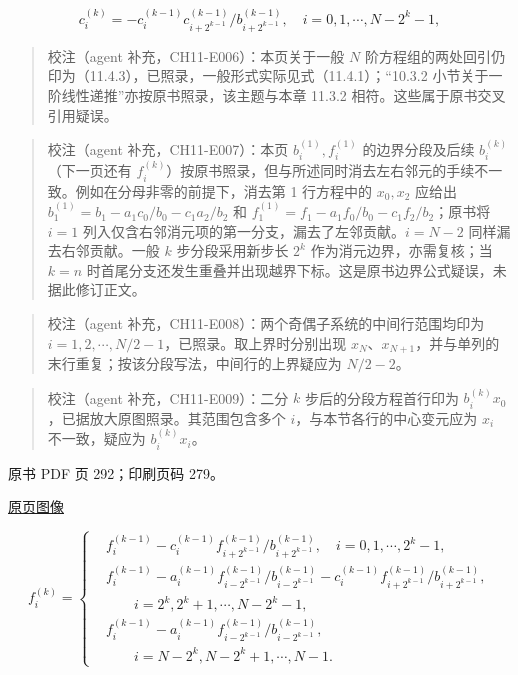 \[
c_i^{(k)}=-c_i^{(k-1)}c_{i+2^{k-1}}^{(k-1)}/b_{i+2^{k-1}}^{(k-1)},\quad i=0,1,\cdots,N-2^k-1,
\]

\begin{quote}
校注（agent 补充，CH11-E006）：本页关于一般 \(N\) 阶方程组的两处回引仍印为（11.4.3），已照录，一般形式实际见式（11.4.1）；``10.3.2 小节关于一阶线性递推''亦按原书照录，该主题与本章 11.3.2 相符。这些属于原书交叉引用疑误。
\end{quote}

\begin{quote}
校注（agent 补充，CH11-E007）：本页 \(b_i^{(1)},f_i^{(1)}\) 的边界分段及后续 \(b_i^{(k)}\)（下一页还有 \(f_i^{(k)}\)）按原书照录，但与所述同时消去左右邻元的手续不一致。例如在分母非零的前提下，消去第 1 行方程中的 \(x_0,x_2\) 应给出 \(b_1^{(1)}=b_1-a_1c_0/b_0-c_1a_2/b_2\) 和 \(f_1^{(1)}=f_1-a_1f_0/b_0-c_1f_2/b_2\)；原书将 \(i=1\) 列入仅含右邻消元项的第一分支，漏去了左邻贡献。\(i=N-2\) 同样漏去右邻贡献。一般 \(k\) 步分段采用新步长 \(2^k\) 作为消元边界，亦需复核；当 \(k=n\) 时首尾分支还发生重叠并出现越界下标。这是原书边界公式疑误，未据此修订正文。
\end{quote}

\begin{quote}
校注（agent 补充，CH11-E008）：两个奇偶子系统的中间行范围均印为 \(i=1,2,\cdots,N/2-1\)，已照录。取上界时分别出现 \(x_N\)、\(x_{N+1}\)，并与单列的末行重复；按该分段写法，中间行的上界疑应为 \(N/2-2\)。
\end{quote}

\begin{quote}
校注（agent 补充，CH11-E009）：二分 \(k\) 步后的分段方程首行印为 \(b_i^{(k)}x_0\)，已据放大原图照录。其范围包含多个 \(i\)，与本节各行的中心变元应为 \(x_i\) 不一致，疑应为 \(b_i^{(k)}x_i\)。
\end{quote}

\clearpage

原书 PDF 页 292；印刷页码 279。

\href{source-images/pdf-292.jpeg}{原页图像}

\[
f_i^{(k)}=
\left\{
\begin{aligned}
&f_i^{(k-1)}-c_i^{(k-1)}f_{i+2^{k-1}}^{(k-1)}/b_{i+2^{k-1}}^{(k-1)},\quad i=0,1,\cdots,2^k-1,\\
&f_i^{(k-1)}-a_i^{(k-1)}f_{i-2^{k-1}}^{(k-1)}/b_{i-2^{k-1}}^{(k-1)}-c_i^{(k-1)}f_{i+2^{k-1}}^{(k-1)}/b_{i+2^{k-1}}^{(k-1)},\\
&\qquad i=2^k,2^k+1,\cdots,N-2^k-1,\\
&f_i^{(k-1)}-a_i^{(k-1)}f_{i-2^{k-1}}^{(k-1)}/b_{i-2^{k-1}}^{(k-1)},\\
&\qquad i=N-2^k,N-2^k+1,\cdots,N-1.
\end{aligned}
\right.
\]

